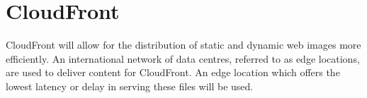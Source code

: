 \chapter{CloudFront}\label{ch:cloudfront}

CloudFront will allow for the distribution of static and dynamic web images more efficiently.
An international network of data centres, referred to as edge locations, are used to deliver content for CloudFront.
An edge location which offers the lowest latency or delay in serving these files will be used.